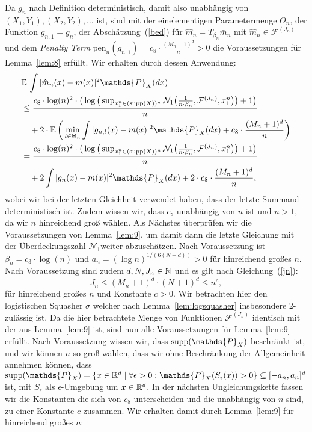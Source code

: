 Da $g_n$ nach Definition deterministisch, damit also unabhängig von $(X_1, Y_1), (X_2, Y_2),\dots$ ist, sind mit der einelementigen Parametermenge $\Theta_n$, der Funktion $g_{n,1} = g_n$, der Abschätzung~(\ref{bed}) für $\hat{m}_n = T_{\beta_n}\bar{m}_n$ mit $\hat{m}_n \in \mathcal{F}^{(J_n)}$ und dem \emph{Penalty Term} $\mathrm{pen}_n(g_{n,1}) = c_8 \cdot \frac{(M_n + 1)^d}{n} > 0$ die Voraussetzungen für Lemma~\ref{lem:8} erfüllt. Wir erhalten durch dessen Anwendung:
\begin{equation*}
\begin{split}
& \E \int |\hat{m}_n(x) - m(x)|^2 \mathds{P}_X(dx) \\
& \leq \frac{c_8 \cdot \log(n)^2 \cdot \big(\log\big(\sup_{x_1^n \in (\supp(X))^n}\mathcal{N}_1\big(\frac{1}{n \cdot \beta_n},\mathcal{F}^{(J_n)},x_1^n\big)\big) + 1\big)}{n} \\
& \quad + 2 \cdot \E\bigg(\min_{l \in \Theta_n} \int |g_{n,l}(x) - m(x)|^2 \mathds{P}_X(dx) + c_8 \cdot \frac{(M_n + 1)^d}{n}\bigg) \\
& = \frac{c_8 \cdot \log(n)^2 \cdot \big(\log\big(\sup_{x_1^n \in (\supp(X))^n}\mathcal{N}_1\big(\frac{1}{n \cdot \beta_n},\mathcal{F}^{(J_n)},x_1^n\big)\big) + 1\big)}{n} \\
& \quad + 2 \int |g_{n}(x) - m(x)|^2 \mathds{P}_X(dx) + 2 \cdot c_8 \cdot \frac{(M_n + 1)^d}{n},
\end{split}
\end{equation*}
wobei wir bei der letzten Gleichheit verwendet haben, dass der letzte Summand deterministisch ist. Zudem wissen wir, dass $c_8$ unabhängig von $n$ ist und $n > 1$, da wir $n$ hinreichend groß wählen.
Als Nächstes überprüfen wir die Voraussetzungen von Lemma~\ref{lem:9}, um damit dann die letzte Gleichung mit der Überdeckungszahl $\mathcal{N}_1$weiter abzuschätzen.
Nach Voraussetzung ist $\beta_n = c_3 \cdot \log(n)$ und $a_n = (\log n)^{1/(6(N + d))} > 0$ für hinreichend großes $n$. Nach Voraussetzung sind zudem $d, N, J_n \in \mathbb{N}$ und es gilt nach Gleichung~(\ref{jn}): 
$$J_n \leq (M_n + 1)^d \cdot (N + 1)^d \leq n^{c},$$
für hinreichend großes $n$ und Konstante $c > 0$. Wir betrachten hier den logistischen Squasher $\sigma$ welcher nach Lemma~\ref{lem:logsquasher} insbesondere 2-zulässig ist. Da die hier betrachtete Menge von Funktionen $\mathcal{F}^{(J_n)}$ identisch mit der aus Lemma~\ref{lem:9} ist, sind nun alle Voraussetzungen für Lemma~\ref{lem:9} erfüllt. Nach Voraussetzung wissen wir, dass $\supp(\mathds{P}_X)$ beschränkt ist, und wir können $n$ so groß wählen, dass wir ohne Beschränkung der Allgemeinheit annehmen können, dass $\supp(\mathds{P}_X) = \{x \in \R^d \mid \forall \epsilon > 0 : \mathds{P}_X(S_{\epsilon}(x)) > 0\} \subseteq [-a_n, a_n]^d$ ist, mit $S_{\epsilon}$ als $\epsilon$-Umgebung um $x \in \mathbb{R}^d$. In der nächsten Ungleichungskette fassen wir die Konstanten die sich von $c_8$ unterscheiden und die unabhängig von $n$ sind, zu einer Konstante $c$ zusammen. Wir erhalten damit durch Lemma~\ref{lem:9} für hinreichend großes $n$:
